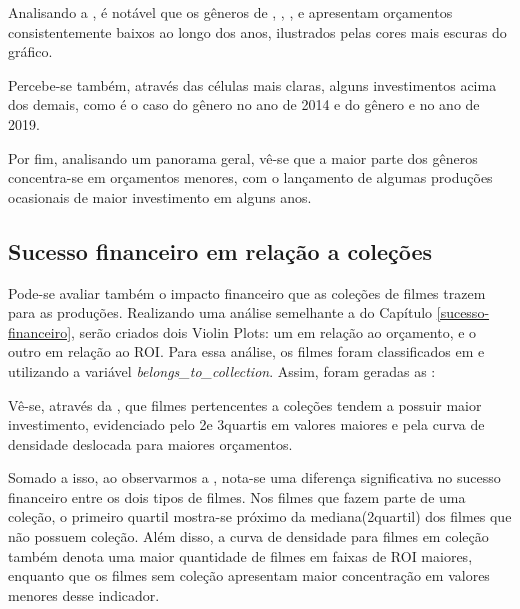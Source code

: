 Analisando a , é notável que os gêneros de , , ,   e  apresentam orçamentos consistentemente baixos ao longo dos anos, ilustrados pelas cores mais escuras do gráfico.

Percebe-se também, através das células mais claras, alguns investimentos acima dos demais, como é o caso do gênero  no ano de 2014 e do gênero  e  no ano de 2019.

Por fim, analisando um panorama geral, vê-se que a maior parte dos gêneros concentra-se em orçamentos menores, com o lançamento de algumas produções ocasionais de maior investimento em alguns anos.


\subsection{Sucesso financeiro em relação a coleções}
Pode-se avaliar também o impacto financeiro que as coleções de filmes trazem para as produções. Realizando uma análise semelhante a do Capítulo \ref{sucesso-financeiro}, serão criados dois Violin Plots: um em relação ao orçamento, e o outro em relação ao \acrshort{ROI}. Para essa análise, os filmes foram classificados em  e  utilizando a variável \textit{belongs\_to\_collection}. Assim, foram geradas as :

%

%

Vê-se, através da , que filmes pertencentes a coleções tendem a possuir maior investimento, evidenciado pelo 2\degree e 3\degree quartis em valores maiores e pela curva de densidade deslocada para maiores orçamentos.

Somado a isso, ao observarmos a , nota-se uma diferença significativa no sucesso financeiro entre os dois tipos de filmes. Nos filmes que fazem parte de uma coleção, o primeiro quartil mostra-se próximo da mediana(2\degree quartil) dos filmes que não possuem coleção. Além disso, a curva de densidade para filmes em coleção também denota uma maior quantidade de filmes em faixas de \acrshort{ROI} maiores, enquanto que os filmes sem coleção apresentam maior concentração em valores menores desse indicador.

